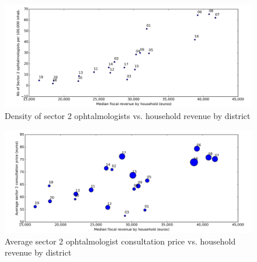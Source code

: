 \documentclass[11pt]{article}
\begin{document}
\begin{figure}[H]
    \caption{Density of sector 2 ophtalmologists vs. household revenue by district}
	\centering
		\includegraphics[width=16cm]{images/Ophtalmo_Ardt_DensityS2VsRevenue.png}
\end{figure}

\begin{figure}[H]
    \caption{Average sector 2 ophtalmologist consultation price vs. household revenue by district}
	\centering
		\includegraphics[width=16cm]{images/Ophtalmo_Ardt_ConsultationS2VsRevenue.png}
\end{figure}

\clearpage

\appendix
\end{document}

